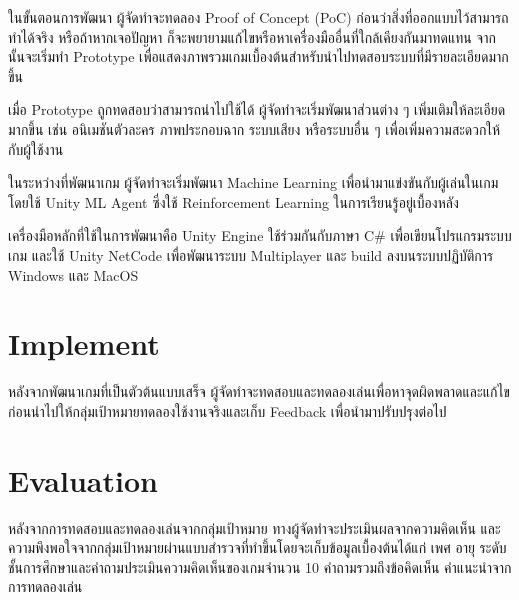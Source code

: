 \documentclass[12pt,oneside,openright,a4paper]{cpe-thai-project}
\begin{document}
ในขั้นตอนการพัฒนา ผู้จัดทำจะทดลอง Proof of Concept (PoC) ก่อนว่าสิ่งที่ออกแบบไว้สามารถทำได้จริง 
หรือถ้าหากเจอปัญหา ก็จะพยายามแก้ไขหรือหาเครื่องมืออื่นที่ใกล้เคียงกันมาทดแทน จากนั้นจะเริ่มทำ Prototype 
เพื่อแสดงภาพรวมเกมเบื้องต้นสำหรับนำไปทดสอบระบบที่มีรายละเอียดมากขึ้น 

เมื่อ Prototype ถูกทดสอบว่าสามารถนำไปใช้ได้ ผู้จัดทำจะเริ่มพัฒนาส่วนต่าง ๆ เพิ่มเติมให้ละเอียดมากขึ้น เช่น 
อนิเมชันตัวละคร ภาพประกอบฉาก ระบบเสียง หรือระบบอื่น ๆ เพื่อเพิ่มความสะดวกให้กับผู้ใช้งาน

ในระหว่างที่พัฒนาเกม ผู้จัดทำจะเริ่มพัฒนา Machine Learning เพื่อนำมาแข่งขันกับผู้เล่นในเกม โดยใช้ 
Unity ML Agent ซึ่งใช้ Reinforcement Learning ในการเรียนรู้อยู่เบื้องหลัง

เครื่องมือหลักที่ใช้ในการพัฒนาคือ Unity Engine ใช้ร่วมกันกับภาษา C\# เพื่อเขียนโปรแกรมระบบเกม 
และใช้ Unity NetCode เพื่อพัฒนาระบบ Multiplayer และ build ลงบนระบบปฏิบัติการ Windows และ MacOS 

\section{Implement}

หลังจากพัฒนาเกมที่เป็นตัวต้นแบบเสร็จ ผู้จัดทำจะทดสอบและทดลองเล่นเพื่อหาจุดผิดพลาดและแก้ไข 
ก่อนนำไปให้กลุ่มเป้าหมายทดลองใช้งานจริงและเก็บ Feedback เพื่อนำมาปรับปรุงต่อไป


\section{Evaluation}

หลังจากการทดสอบและทดลองเล่นจากกลุ่มเป้าหมาย ทางผู้จัดทำจะประเมินผลจากความคิดเห็น
และความพึงพอใจจากกลุ่มเป้าหมายผ่านแบบสำรวจที่ทำขึ้นโดยจะเก็บข้อมูลเบื้องต้นได้แก่ เพศ อายุ 
ระดับชั้นการศึกษาและคำถามประเมินความคิดเห็นของเกมจำนวน 10 คำถามรวมถึงข้อคิดเห็น คำแนะนำจากการทดลองเล่น


\end{document}
